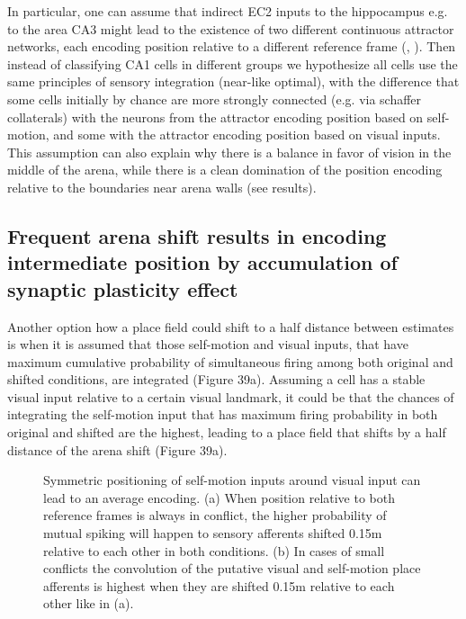 In particular, one can assume that indirect EC2 inputs to the hippocampus e.g. to the area CA3 might lead to the existence of two different continuous attractor networks, each encoding position relative to a different reference frame (\cite{Li2020}, \cite{Haas2019}). Then instead of classifying CA1 cells in different groups we hypothesize all cells use the same principles of sensory integration (near-like optimal), with the difference that some cells initially by chance are more strongly connected (e.g. via schaffer collaterals) with the neurons from the attractor encoding position based on self-motion, and some with the attractor encoding position based on visual inputs. This assumption can also explain why there is a balance in favor of vision in the middle of the arena, while there is a clean domination of the position encoding relative to the boundaries near arena walls (see results).


\subsection{Frequent arena shift results in encoding intermediate position by accumulation of synaptic plasticity effect}

Another option how a place field could shift to a half distance between estimates is when it is assumed that those self-motion and visual inputs, that have maximum cumulative probability of simultaneous firing among both original and shifted conditions, are integrated (Figure 39a). Assuming a cell has a stable visual input relative to a certain visual landmark, it could be that the chances of integrating the self-motion input that has maximum firing probability in both original and shifted are the highest, leading to a place field that shifts by a half distance of the arena shift (Figure 39a).

\begin{figure}
\captionsetup{format=plain}
\caption[Symmetric encoding wia synaptic plasticity]{
Symmetric positioning of self-motion inputs around visual input can lead to an average encoding. (a) When position relative to both reference frames is always in conflict, the higher probability of mutual spiking will happen to sensory afferents shifted 0.15m relative to each other in both conditions. (b) In cases of small conflicts the convolution of the putative visual and self-motion place afferents is highest when they are shifted 0.15m relative to each other like in (a).
}
\label{fig:F39_symmetric_encoding}
\end{figure}


